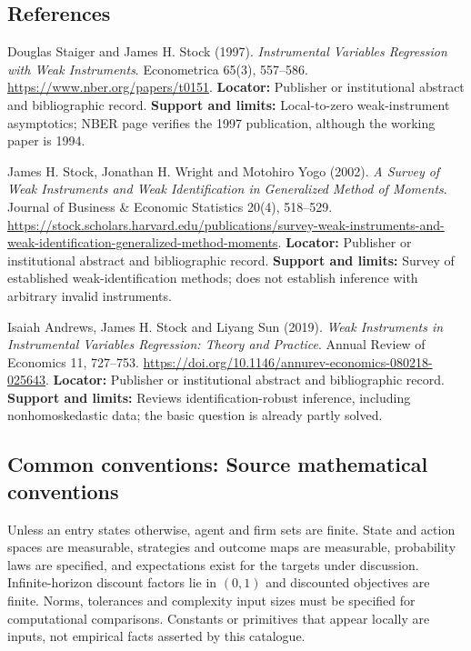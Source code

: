 \documentclass[11pt,a4paper]{article}
\begin{document}
\subsection*{References}

\begin{enumerate}[label={[\textnormal{S}\arabic*]},leftmargin=*]

\item Douglas Staiger and James H. Stock (1997). \emph{Instrumental Variables Regression with Weak Instruments}. Econometrica 65(3), 557–586. \url{https://www.nber.org/papers/t0151}. \textbf{Locator:} Publisher or institutional abstract and bibliographic record. \textbf{Support and limits:} Local-to-zero weak-instrument asymptotics; NBER page verifies the 1997 publication, although the working paper is 1994.

\item James H. Stock, Jonathan H. Wright and Motohiro Yogo (2002). \emph{A Survey of Weak Instruments and Weak Identification in Generalized Method of Moments}. Journal of Business \& Economic Statistics 20(4), 518–529. \url{https://stock.scholars.harvard.edu/publications/survey-weak-instruments-and-weak-identification-generalized-method-moments}. \textbf{Locator:} Publisher or institutional abstract and bibliographic record. \textbf{Support and limits:} Survey of established weak-identification methods; does not establish inference with arbitrary invalid instruments.

\item Isaiah Andrews, James H. Stock and Liyang Sun (2019). \emph{Weak Instruments in Instrumental Variables Regression: Theory and Practice}. Annual Review of Economics 11, 727–753. \url{https://doi.org/10.1146/annurev-economics-080218-025643}. \textbf{Locator:} Publisher or institutional abstract and bibliographic record. \textbf{Support and limits:} Reviews identification-robust inference, including nonhomoskedastic data; the basic question is already partly solved.

\end{enumerate}

\subsection*{Common conventions: Source mathematical conventions}

Unless an entry states otherwise, agent and firm sets are finite. State and action spaces are measurable, strategies and outcome maps are measurable, probability laws are specified, and expectations exist for the targets under discussion. Infinite-horizon discount factors lie in $(0,1)$ and discounted objectives are finite. Norms, tolerances and complexity input sizes must be specified for computational comparisons. Constants or primitives that appear locally are inputs, not empirical facts asserted by this catalogue.
\end{document}
